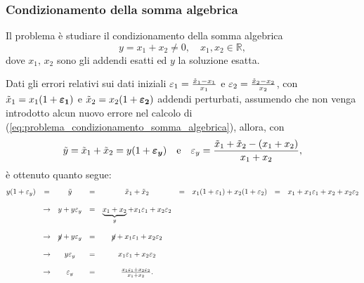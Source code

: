\subsubsection{Condizionamento della somma algebrica}\label{sssec:condizionamento_somma_algebrica}
Il problema è studiare il condizionamento della somma algebrica
\begin{equation}\label{eq:problema_condizionamento_somma_algebrica}
	y=x_1+x_2\neq 0,\quad x_1,x_2\in\mathbb R,
\end{equation}
dove $x_1,\, x_2$ sono gli addendi esatti ed $y$ la soluzione esatta.

Dati gli errori relativi sui dati iniziali $\varepsilon_1=\frac{\Tilde{x}_1-x_1}{x_1}$ e $\varepsilon_2=\frac{\Tilde{x}_2-x_2}{x_2}$, con $\Tilde{x}_1=x_1(1+\boldsymbol{\varepsilon_1})$ e $\Tilde{x}_2=x_2(1+\boldsymbol{\varepsilon_2})$ addendi perturbati, assumendo che non venga introdotto alcun nuovo errore nel calcolo di (\ref{eq:problema_condizionamento_somma_algebrica}), allora, con
\begin{equation*}
	\Tilde{y}=\Tilde{x}_1+\Tilde{x}_2=y(1+\boldsymbol{\varepsilon_y})\quad\text{e}\quad\varepsilon_y=\frac{\Tilde{x}_1+\Tilde{x}_2-(x_1+x_2)}{x_1+x_2},
\end{equation*}
è ottenuto quanto segue:
\begin{equation}\label{eq:errore_relativo_y_somma_algebrica}
	\begin{matrix}
		y(1+\varepsilon_y)&=&\Tilde{y}&=&\Tilde{x}_1+\Tilde{x}_2&=&x_1(1+\varepsilon_1)+x_2(1+\varepsilon_2)&=&x_1+x_1\varepsilon_1+x_2+x_2\varepsilon_2\\\\
		&\rightarrow& y+y\varepsilon_y&=&\underbrace{x_1+x_2}_{y}+x_1\varepsilon_1+x_2\varepsilon_2\\\\
		&\rightarrow& \cancel{y}+y\varepsilon_y &=& \cancel{y}+x_1\varepsilon_1+x_2\varepsilon_2\\\\
		&\rightarrow& y\varepsilon_y &=& x_1\varepsilon_1+x_2\varepsilon_2 \\\\
		&\rightarrow& \varepsilon_y &=& \frac{x_1\varepsilon_1+x_2\varepsilon_2}{x_1+x_2}.
	\end{matrix}
\end{equation}

